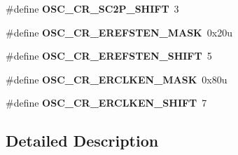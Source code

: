 \begin{DoxyCompactItemize}
\item 
\mbox{\label{group___o_s_c___register___masks_ga0ec9adaf1ca3ec309f1a2c2fd37d3f4d}} 
\#define {\bfseries O\+S\+C\+\_\+\+C\+R\+\_\+\+S\+C2\+P\+\_\+\+S\+H\+I\+FT}~3
\item 
\mbox{\label{group___o_s_c___register___masks_ga3024913f44011d333c6f48ddb00fbf9d}} 
\#define {\bfseries O\+S\+C\+\_\+\+C\+R\+\_\+\+E\+R\+E\+F\+S\+T\+E\+N\+\_\+\+M\+A\+SK}~0x20u
\item 
\mbox{\label{group___o_s_c___register___masks_gac1b9c5d7f156f1792255204dae816aba}} 
\#define {\bfseries O\+S\+C\+\_\+\+C\+R\+\_\+\+E\+R\+E\+F\+S\+T\+E\+N\+\_\+\+S\+H\+I\+FT}~5
\item 
\mbox{\label{group___o_s_c___register___masks_gab96140627de270278cbdfc81fbef63fc}} 
\#define {\bfseries O\+S\+C\+\_\+\+C\+R\+\_\+\+E\+R\+C\+L\+K\+E\+N\+\_\+\+M\+A\+SK}~0x80u
\item 
\mbox{\label{group___o_s_c___register___masks_ga56f4aa6f215268327accda5434671187}} 
\#define {\bfseries O\+S\+C\+\_\+\+C\+R\+\_\+\+E\+R\+C\+L\+K\+E\+N\+\_\+\+S\+H\+I\+FT}~7
\end{DoxyCompactItemize}


\subsection{Detailed Description}
